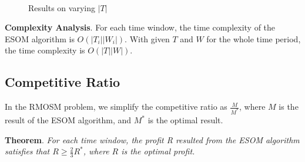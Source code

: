 \documentclass[color,twoside,amssymb,twocolumn]{article}
\begin{document}
\begin{figure}[htb]
	\centering
	\hspace{1in}
	~~	
	\caption{Results on varying $|T|$}
	\label{fig:subfig} %
\end{figure}

\textbf{Complexity Analysis}. For each time window, the time complexity of the ESOM algorithm is $O(|T_i||W_i|)$. With given $T$ and $W$ for the whole time period, the time complexity is $O(|T||W|)$.

\subsection{Competitive Ratio}

In the RMOSM problem, we simplify the competitive ratio as $\frac{M}{M^{*}}$, where $M$ is the result of the ESOM algorithm, and $M^{*}$ is the optimal result. 

\noindent \textbf{Theorem}. {\it For each time window, the profit R resulted from the ESOM algorithm satisfies that $R \geq \frac{2}{3}R^*$, where $R$ is the optimal profit.}
\end{document}
